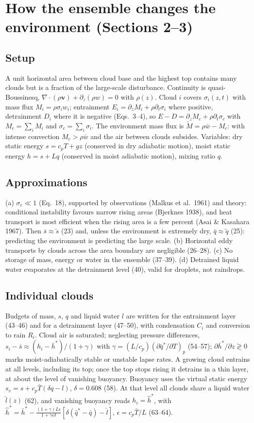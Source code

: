 \documentclass[10pt,a4paper]{article}
\begin{document}
\section{How the ensemble changes the environment (Sections 2--3)}
\subsection{Setup} A unit horizontal area between cloud base and the highest top contains many clouds but is a fraction of the large-scale disturbance. Continuity is quasi-Boussinesq, $\nabla\cdot(\rho\mathbf v)+\partial_z(\rho w)=0$ with $\rho(z)$. Cloud $i$ covers $\sigma_i(z,t)$ with mass flux $M_i=\rho\sigma_iw_i$; entrainment $E_i=\partial_zM_i+\rho\partial_t\sigma_i$ where positive, detrainment $D_i$ where it is negative (Eqs.\ 3--4), so $E-D=\partial_zM_c+\rho\partial_t\sigma_c$ with $M_c=\sum_iM_i$ and $\sigma_c=\sum_i\sigma_i$. The environment mass flux is $\tilde M=\rho\bar w-M_c$: with intense convection $M_c>\rho\bar w$ and the air between clouds subsides. Variables: dry static energy $s=c_pT+gz$ (conserved in dry adiabatic motion), moist static energy $h=s+Lq$ (conserved in moist adiabatic motion), mixing ratio $q$.

\subsection{Approximations} (a) $\sigma_c\ll1$ (Eq.\ 18), supported by observations (Malkus et al.\ 1961) and theory: conditional instability favours narrow rising areas (Bjerknes 1938), and heat transport is most efficient when the rising area is a few percent (Asai \& Kasahara 1967). Then $\bar s\approx\tilde s$ (23) and, unless the environment is extremely dry, $\bar q\approx\tilde q$ (25): predicting the environment is predicting the large scale. (b) Horizontal eddy transports by clouds across the area boundary are negligible (26--28). (c) No storage of mass, energy or water in the ensemble (37--39). (d) Detrained liquid water evaporates at the detrainment level (40), valid for droplets, not raindrops.

\subsection{Individual clouds} Budgets of mass, $s$, $q$ and liquid water $l$ are written for the entrainment layer (43--46) and for a detrainment layer (47--50), with condensation $C_i$ and conversion to rain $R_i$. Cloud air is saturated; neglecting pressure differences, $s_i-\bar s\approx(h_i-\bar h^*)/(1+\gamma)$ with $\gamma=(L/c_p)(\partial\bar q^*/\partial T)_p$ (54--57); $\partial\bar h^*/\partial z\gtrless0$ marks moist-adiabatically stable or unstable lapse rates. A growing cloud entrains at all levels, including its top; once the top stops rising it detrains in a thin layer, at about the level of vanishing buoyancy. Buoyancy uses the virtual static energy $s_v=s+c_p\bar T(\delta q-l)$, $\delta=0.608$ (58). At that level all clouds share a liquid water $\hat l(z)$ (62), and vanishing buoyancy reads $h_i=\hat h^*$, with $\hat h^*=\bar h^*-\frac{(1+\gamma)L\epsilon}{1+\gamma\epsilon\delta}[\delta(\bar q^*-\bar q)-\hat l]$, $\epsilon=c_p\bar T/L$ (63--64).
\end{document}
